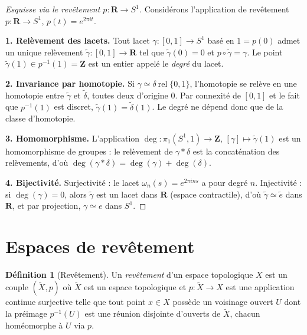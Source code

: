 \documentclass[12pt,a4paper,openany]{book}
\theoremstyle{definition}
\newtheorem{definition}{Définition}[chapter]
\theoremstyle{cours}
\theoremstyle{coursnormal}
\begin{document}
\begin{proof}[Esquisse via le revêtement $p\colon\mathbf{R}\to S^1$]
Considérons l'application de revêtement
$p\colon\mathbf{R}\to S^1$, $p(t)=e^{2\pi it}$.

\textbf{1. Relèvement des lacets.}
Tout lacet $\gamma\colon[0,1]\to S^1$ basé en $1=p(0)$ admet un unique
relèvement $\tilde{\gamma}\colon[0,1]\to\mathbf{R}$ tel que
$\tilde{\gamma}(0)=0$ et $p\circ\tilde{\gamma}=\gamma$.
Le point $\tilde{\gamma}(1)\in p^{-1}(1)=\mathbf{Z}$ est un entier
appelé le \emph{degré} du lacet.

\textbf{2. Invariance par homotopie.}
Si $\gamma\simeq\delta\ \mathrm{rel}\;\{0,1\}$, l'homotopie se relève
en une homotopie entre $\tilde{\gamma}$ et $\tilde{\delta}$, toutes
deux d'origine $0$. Par connexité de $[0,1]$ et le fait que
$p^{-1}(1)$ est discret, $\tilde{\gamma}(1)=\tilde{\delta}(1)$.
Le degré ne dépend donc que de la classe d'homotopie.

\textbf{3. Homomorphisme.}
L'application $\deg\colon\pi_1(S^1,1)\to\mathbf{Z}$,
$[\gamma]\mapsto\tilde{\gamma}(1)$ est un homomorphisme de groupes :
le relèvement de $\gamma*\delta$ est la concaténation des relèvements,
d'où $\deg(\gamma*\delta)=\deg(\gamma)+\deg(\delta)$.

\textbf{4. Bijectivité.}
Surjectivité : le lacet $\omega_n(s)=e^{2\pi ins}$ a pour degré $n$.
Injectivité : si $\deg(\gamma)=0$, alors $\tilde{\gamma}$ est un lacet
dans $\mathbf{R}$ (espace contractile), d'où
$\tilde{\gamma}\simeq \tilde{e}$ dans $\mathbf{R}$, et par projection,
$\gamma\simeq e$ dans $S^1$.
\end{proof}

\section{Espaces de revêtement}
\label{sec:revetements}

\begin{definition}[Revêtement]
\label{def:revetement}
Un \emph{revêtement} d'un espace topologique $X$ est un couple
$(\tilde{X},p)$ où $\tilde{X}$ est un espace topologique et
$p\colon\tilde{X}\to X$ est une application continue surjective telle
que tout point $x\in X$ possède un voisinage ouvert $U$ dont la
préimage $p^{-1}(U)$ est une réunion disjointe d'ouverts de
$\tilde{X}$, chacun homéomorphe à $U$ via $p$.
\end{definition}
\end{document}
